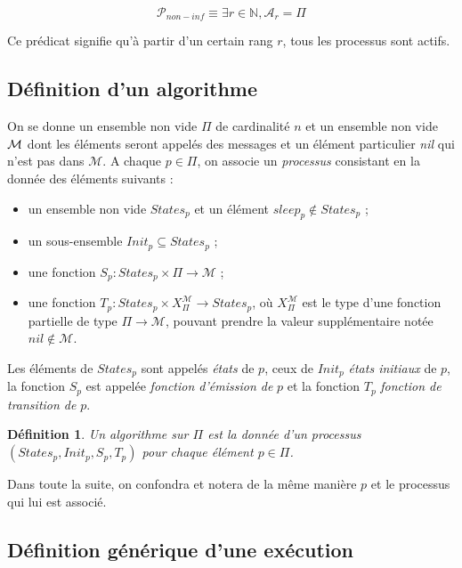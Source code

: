 \documentclass{article}
\newtheorem{definition}{Définition}
\begin{document}
$$\mathcal{P}_{non-inf} \equiv \exists r \in \mathds{N}, \mathcal{A}_r = \Pi$$

Ce prédicat signifie qu'à partir d'un certain rang $r$, tous les processus sont actifs.

\subsection{Définition d'un algorithme}

On se donne un ensemble non vide $\Pi$ de cardinalit\'e $n$ et  un ensemble non vide ${\cal M}$ dont les \'el\'ements seront appel\'es des
	messages et un \'el\'ement particulier {\em nil} qui n'est pas dans $\mathcal{M}$.
A chaque  $p \in \Pi$,  on associe  un {\em processus} consistant en la donn\'ee des \'el\'ements 
	suivants :
	\begin{itemize}
	\item un ensemble non vide $States_p$ et un  \'el\'ement $sleep_p \notin States_p$ ;
	\item un sous-ensemble   $Init_p \subseteq States_p$ ;
	\item une fonction $S_p : States_p \times \Pi \rightarrow \mathcal{M}$ ;
	\item une fonction 
		$T_p : States_p \times X_\Pi^\mathcal{M}
	  \rightarrow States_p$,
	  où  $X_\Pi^\mathcal{M}$ est le type d'une fonction partielle
			de type $\Pi \rightarrow \mathcal{M}$, pouvant prendre la valeur supplémentaire notée $nil \notin \mathcal{M}$.
	\end{itemize}
Les \'el\'ements de 	$States_p$  sont appel\'es \emph{\'etats} de $p$, ceux de $Init_p$ \emph{\'etats initiaux} de $p$,
	la fonction $S_p$ est appel\'ee \emph{fonction d'émission de} $p$ et la fonction $T_p$ \emph{fonction de transition de} $p$.

\begin{definition}\label{def:algo}
Un algorithme  sur $\Pi$ est la donn\'ee d'un processus $(States_p, Init_p, S_p,T_p)$ pour chaque  \'el\'ement $p \in \Pi$.
\end{definition}
\noindent Dans toute la suite, on confondra et notera de la m\^eme mani\`ere $p$ et le processus qui lui est associ\'e.

\subsection{Définition générique d'une exécution}
\end{document}
